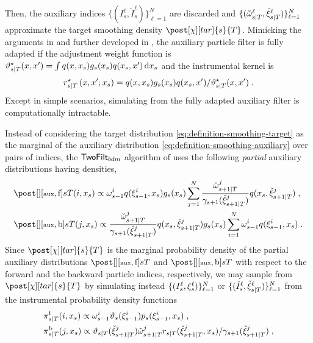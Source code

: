 Then, the auxiliary indices $\{(I_{s}^\ell,\check{I}_{s}^\ell)\}_{\ell=1}^N$ are discarded and $\{ (\tilde{\omega}_{s|T}^{\ell},\tilde{\xi}_{s|T}^{\ell}) \}_{\ell=1}^N$ approximate the target smoothing density $\post[\Xinit][tar]{s}{T}$. Mimicking the arguments in \cite{huerzeler:kunsch:1998} and further developed in \cite{kuensch:2005}, the auxiliary particle filter is fully adapted if the adjustment weight function is $\adjfunc[fully]{s}{T}{x,x'} = \int q(x,x_s) g_s(x_s) q(x_s,x') \, \rmd x_s$ and the instrumental kernel is
\[
\kiss[fully]{s}{T}\left(x,x'; x_s\right) = q(x,x_s) g_s(x_s) q(x_s,x')/\adjfunc[fully]{s}{T}{x,x'}\eqsp.
\]
 Except in simple scenarios, simulating from the fully adapted auxiliary filter is computationally intractable.

Instead of considering the target distribution \eqref{eq:definition-smoothing-target} as the marginal of the auxiliary distribution \eqref{eq:definition-smoothing-auxiliary}
over pairs of indices, the $\mathsf{TwoFilt}_{bdm}$ algorithm of  \cite{briers:doucet:maskell:2010} uses the following \emph{partial} auxiliary distributions having densities,
\begin{align*}
& \post[][\aux,\mathrm{f}]{s}{T}(i,x_s) \propto  \ewght{s-1}{i} q(\epart{s-1}{i}, x_s) g_s(x_s) \sum_{j=1}^N \frac{\ebackwght{s+1}{T}{j}}{\gamma_{s+1}(\ebackpart{s+1}{T}{j})} q(x_s, \ebackpart{s+1}{T}{j}) \eqsp,\\
& \post[][\aux, \mathrm{b}]{s}{T}(j,x_s) \propto  \frac{\ebackwght{s+1}{T}{j}}{\gamma_{s+1}(\ebackpart{s+1}{T}{j})} q(x_s, \ebackpart{s+1}{T}{j}) g_s(x_s) \sum_{i=1}^N \ewght{s-1}{i} q(\epart{s-1}{i},x_s) \eqsp.
\end{align*}
Since $\post[\Xinit][tar]{s}{T}$ is the marginal probability density of the partial auxiliary distributions $\post[][\aux,\mathrm{f}]{s}{T}$ and $\post[][\aux,\mathrm{b}]{s}{T}$ with respect to the forward and the backward particle indices, respectively, we may sample from $\post[\Xinit][tar]{s}{T}$ by simulating instead $\{(I_s^\ell,\xi_{s}^{\ell}) \}_{\ell=1}^N$ or $\{(\check{I}_{s}^\ell,{\check{\xi}}_{s|T}^{\ell}) \}_{\ell=1}^N$ from the instrumental probability density functions
\begin{align*}
&\instrpostaux{s}{T}^{\mathrm{f}}(i,x_s) \propto  \ewght{s-1}{i} \adjfuncforward{s}(\epart{s-1}{i}) \kissforward{s}{s}(\epart{s-1}{i}, x_s) \eqsp, \\
&\instrpostaux{s}{T}^{\mathrm{b}}(j,x_s) \propto  \adjfunc{s}{T}{\ebackpart{s+1}{T}{j}} \ebackwght{s+1}{T}{j} \kiss{s}{T}(\ebackpart{s+1}{T}{j}, x_s)/\gamma_{s+1}(\ebackpart{s+1}{T}{j}) \eqsp,
\end{align*}
